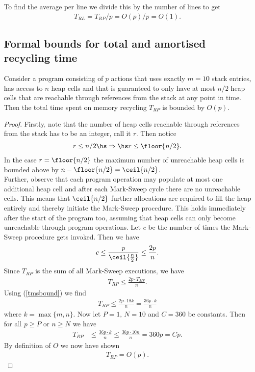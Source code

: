 \documentclass{article}
\begin{document}
To find the average per line we divide this by the number of lines to get
\begin{align*}
    T_{RL} = T_{RP}/p = O(p)/p = O(1).
\end{align*}


\subsection{Formal bounds for total and amortised recycling time}

\begin{claim}
    Consider a program consisting of $p$ actions that uses exactly $m=10$
    stack entries, has access to $n$ heap cells and that is guaranteed to only
    have at most $n/2$ heap cells that are reachable through references
    from the stack at any point in time. Then the total time spent on memory recycling $T_{RP}$ is
    bounded by $O(p)$.
\end{claim}
\begin{proof}
    Firstly, note that the number of heap cells reachable through references
    from the stack has to be an integer, call it $r$. Then notice
    \begin{align*}
        r \leq n / 2 \hs\Rightarrow\hs r \leq \floor{n/2}.
    \end{align*}
    In the case $r=\floor{n/2}$ the maximum number of unreachable heap cells
    is bounded above by $n-\floor{n/2}=\ceil{n/2}$.\\
    \indent Further, observe that each program operation may populate at most one 
    additional heap cell and after each Mark-Sweep cycle there are no unreachable cells.
    This means that
    $\ceil{n/2}$ further allocations are required to fill the heap entirely and
    thereby initiate the Mark-Sweep procedure. This holds immediately after
    the start of the program too, assuming that heap cells can only become unreachable
    through program operations. Let $c$ be the number of times the Mark-Sweep
    procedure gets invoked. Then we have
    \begin{align*}
        c \leq \frac{p}{\ceil{\frac{n}{2}}} \leq \frac{2p}{n}.
    \end{align*}
    Since $T_{RP}$ is the sum of all Mark-Sweep executions, we have
    \begin{align*}
        T_{RP} \leq\frac{2p \cdot T_{MS}}{n}. 
    \end{align*}
    Using (\ref{tmsbound}) we find
    \begin{align}
        \label{trbound}
        T_{RP}\leq\frac{2p\cdot 18k}{n}=\frac{36p\cdot k}{n}
    \end{align}
    where $k=\max\{m,n\}$. Now let $P=1$, $N=10$ and $C=360$ be constants. Then
    for all $p\geq P$ or $n\geq N$ we have
    \begin{align*}
        T_{RP} &\leq \frac{36p\cdot k}{n} \leq \frac{36p\cdot 10n}{n} = 360p = Cp.
    \end{align*}
    By definition of $O$ we now have shown
    \begin{align*}
        T_{RP} = O(p).
    \end{align*}
\end{proof}
\end{document}
